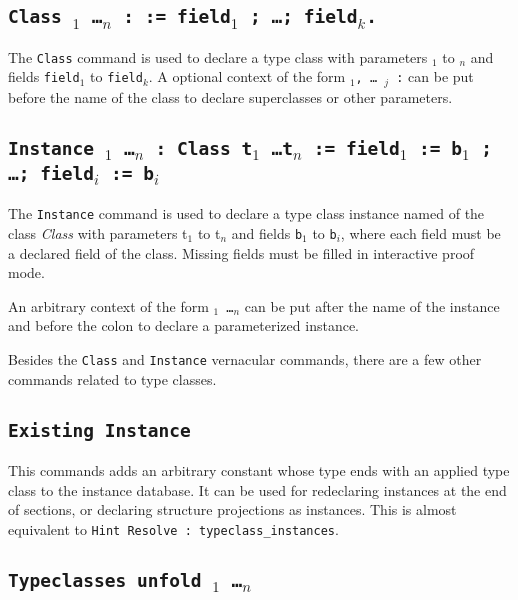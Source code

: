\subsection{\tt Class {\ident} {\binder$_1$ \ldots \binder$_n$} 
  : \sort := field$_1$ ; \ldots ; field$_k$.}
\label{Class}

The \texttt{Class} command is used to declare a type class with
parameters {\binder$_1$} to {\binder$_n$} and fields {\tt field$_1$} to
{\tt field$_k$}. A optional context of the form {\tt \binder$_1$, \ldots
  \binder$_j$ :} can be put before the name of the class to declare
superclasses or other parameters.

\subsection{\tt Instance {\ident} {\binder$_1$ \ldots \binder$_n$} : {Class} {t$_1$ \ldots t$_n$}
  := field$_1$ := b$_1$ ; \ldots ; field$_i$ := b$_i$}
\label{Instance}

The \texttt{Instance} command is used to declare a type class instance
named {\ident} of the class \emph{Class} with parameters {t$_1$} to {t$_n$} and
fields {\tt b$_1$} to {\tt b$_i$}, where each field must be a declared
field of the class. Missing fields must be filled in interactive proof mode.

An arbitrary context of the form {\tt \binder$_1$ \ldots \binder$_n$}
can be put after the name of the instance and before the colon to declare a parameterized instance.

Besides the {\tt Class} and {\tt Instance} vernacular commands, there
are a few other commands related to type classes.

\subsection{\tt Existing Instance {\ident}}
\label{ExistingInstance}

This commands adds an arbitrary constant whose type ends with an applied
type class to the instance database. It can be used for redeclaring
instances at the end of sections, or declaring structure projections as
instances. This is almost equivalent to {\tt Hint Resolve {\ident} :
  typeclass\_instances}.

\subsection{\tt Typeclasses unfold {\ident$_1$ \ldots \ident$_n$}}
\label{TypeclassesUnfold}

